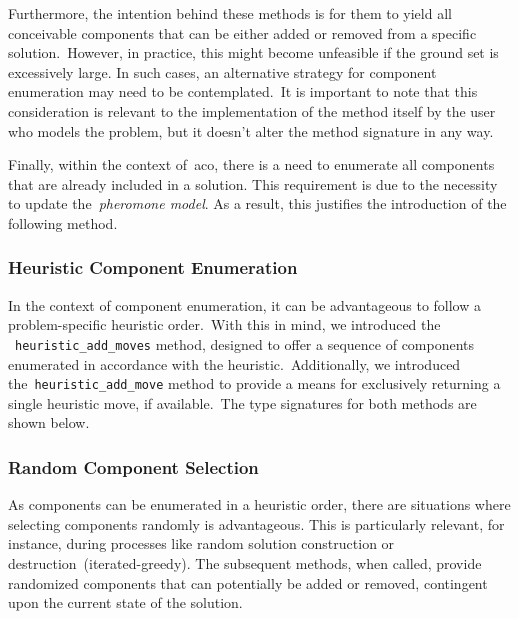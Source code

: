Furthermore, the intention behind these methods is for them to yield all
conceivable components that can be either added or removed from a specific
solution.~However, in practice, this might become unfeasible if the ground set
is excessively large. In such cases, an alternative strategy for component
enumeration may need to be contemplated.~It is important to note that this
consideration is relevant to the implementation of the method itself by the user
who models the problem, but it doesn't alter the method signature in any way.


Finally, within the context of~\acrshort{aco}, there is a need to enumerate all
components that are already included in a solution. This requirement is due to
the necessity to update the~\textit{pheromone model}. As a result, this
justifies the introduction of the following method.

\begin{center}
\end{center}

\subsubsection*{Heuristic Component Enumeration}

In the context of component enumeration, it can be advantageous to follow a
problem-specific heuristic order.~With this in mind, we introduced the
~\texttt{heuristic\_add\_moves} method, designed to offer a sequence of
components enumerated in accordance with the heuristic.~Additionally, we
introduced the~\texttt{heuristic\_add\_move} method to provide a means for
exclusively returning a single heuristic move, if available.~The type signatures
for both methods are shown below.

\begin{center}

\end{center}

\subsubsection*{Random Component Selection}

As components can be enumerated in a heuristic order, there are situations where
selecting components randomly is advantageous. This is particularly relevant,
for instance, during processes like random solution construction or
destruction~(\acrshort{iterated-greedy}). The subsequent methods, when called,
provide randomized components that can potentially be added or removed,
contingent upon the current state of the solution.

